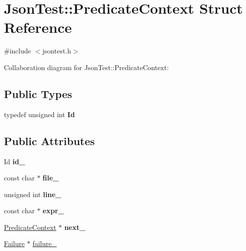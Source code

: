 \hypertarget{struct_json_test_1_1_predicate_context}{\section{Json\+Test\+:\+:Predicate\+Context Struct Reference}
\label{struct_json_test_1_1_predicate_context}
}


{\ttfamily \#include $<$jsontest.\+h$>$}



Collaboration diagram for Json\+Test\+:\+:Predicate\+Context\+:
\subsection*{Public Types}
\begin{DoxyCompactItemize}
\item 
\hypertarget{struct_json_test_1_1_predicate_context_a80ba8a6586d8c5312d0d9952e3c3492f}{typedef unsigned int {\bfseries Id}}\label{struct_json_test_1_1_predicate_context_a80ba8a6586d8c5312d0d9952e3c3492f}

\end{DoxyCompactItemize}
\subsection*{Public Attributes}
\begin{DoxyCompactItemize}
\item 
\hypertarget{struct_json_test_1_1_predicate_context_a709cba7304221ef0e1d4b694f485abb0}{Id {\bfseries id\+\_\+}}\label{struct_json_test_1_1_predicate_context_a709cba7304221ef0e1d4b694f485abb0}

\item 
\hypertarget{struct_json_test_1_1_predicate_context_a93636d299bae4709d53a9c7fe39ad8ab}{const char $\ast$ {\bfseries file\+\_\+}}\label{struct_json_test_1_1_predicate_context_a93636d299bae4709d53a9c7fe39ad8ab}

\item 
\hypertarget{struct_json_test_1_1_predicate_context_a4ea8d1dc66c8a5216337e9d3491f6469}{unsigned int {\bfseries line\+\_\+}}\label{struct_json_test_1_1_predicate_context_a4ea8d1dc66c8a5216337e9d3491f6469}

\item 
\hypertarget{struct_json_test_1_1_predicate_context_a7c40aef3e7964de22199b9176b61ccc6}{const char $\ast$ {\bfseries expr\+\_\+}}\label{struct_json_test_1_1_predicate_context_a7c40aef3e7964de22199b9176b61ccc6}

\item 
\hypertarget{struct_json_test_1_1_predicate_context_a24ce20ac4672a7078182612e6dc97d52}{\hyperlink{struct_json_test_1_1_predicate_context}{Predicate\+Context} $\ast$ {\bfseries next\+\_\+}}\label{struct_json_test_1_1_predicate_context_a24ce20ac4672a7078182612e6dc97d52}

\item 
\hyperlink{class_json_test_1_1_failure}{Failure} $\ast$ \hyperlink{struct_json_test_1_1_predicate_context_a66ab1637a70a09a0cc7eae43f0fcd3ed}{failure\+\_\+}
\end{DoxyCompactItemize}


